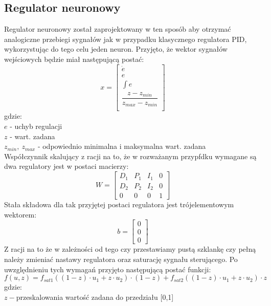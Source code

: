 \subsection{Regulator neuronowy}
Regulator neuronowy został zaprojektowany w ten sposób aby otrzymać analogiczne przebiegi sygnałów jak w przypadku klasycznego regulatora PID, wykorzystując do tego celu jeden neuron. Przyjęto, że wektor sygnałów wejściowych będzie miał następującą postać: 
\begin{equation}\label{key}
x = \begin{bmatrix}
\dot {e}\\
e\\
\int e\\
\dfrac{z-z_{min}}{z_{max} - z_{min}}\\
\end{bmatrix}
\end{equation}
gdzie:\\
$e$ - uchyb regulacji\\
$z$ - wart. zadana\\
$z_{min}, \ z_{max}$ - odpowiednio minimalna i maksymalna wart. zadana\\
Współczynnik skalujący z racji na to, że w rozważanym przypfdku wymagane są dwa regulatory jest w postaci macierzy: 
\begin{equation}\label{key}
W = \begin{bmatrix}
D_1& P_1& I_1&0\\
D_2& P_2& I_2&0\\
0&0&0&1
\end{bmatrix}
\end{equation} 
Stała składowa dla tak przyjętej postaci regulatora jest trójelementowym wektorem:
\begin{equation}\label{key}
b = \begin{bmatrix}
0\\0\\0
\end{bmatrix}
\end{equation}
Z racji na to że w zależności od tego czy przestawiamy pustą szklankę czy pełną należy zmieniać nastawy regulatora oraz saturację sygnału sterującego. Po uwzględnieniu tych wymagań przyjęto następującą postać funkcji:
\begin{equation}\label{key}
f(u,z) = f_{sat1} ((1-z) \cdot u_1 + z \cdot u_2) \cdot (1-z) + f_{sat2} ((1-z) \cdot u_1 + z \cdot u_2) \cdot z
\end{equation}
gdzie: \\
$z - $przeskalowania wartość zadana do przedziału [0,1]\\
